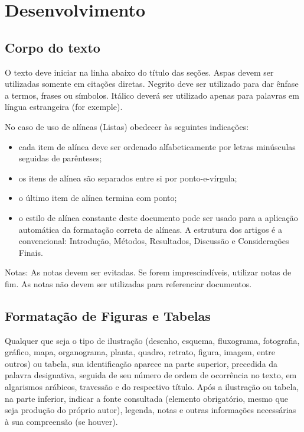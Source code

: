 \documentclass{modelo}
\begin{document}
 
\section{Desenvolvimento}  

\subsection{Corpo do texto} O texto deve iniciar na linha abaixo do título das seções. 
Aspas devem ser utilizadas somente em citações diretas. Negrito deve ser utilizado para dar ênfase a termos, frases ou símbolos. Itálico deverá ser utilizado apenas para palavras em língua estrangeira (for exemple). 

No caso de uso de alíneas (Listas) obedecer às seguintes indicações: 
\begin{itemize}
\item cada item de alínea deve ser ordenado alfabeticamente por letras minúsculas seguidas de parênteses;
\item os itens de alínea são separados entre si por ponto-e-vírgula;
\item o último item de alínea termina com ponto;
\item 	o estilo de alínea constante deste documento pode ser usado para a aplicação automática da formatação correta de alíneas.
A estrutura dos artigos é a convencional: Introdução, Métodos, Resultados, Discussão e Considerações Finais. 
\end{itemize}  

Notas: As notas devem ser evitadas. Se forem imprescindíveis, utilizar notas de fim. As notas não devem ser utilizadas para referenciar documentos. 

 
\subsection{Formatação de Figuras e Tabelas}  
  
Qualquer que seja o tipo de ilustração (desenho, esquema, fluxograma, fotografia, gráfico, mapa, organograma, planta, quadro, retrato, figura, imagem, entre outros) ou tabela, sua identificação aparece na parte superior, precedida da palavra designativa, seguida de seu número de ordem de ocorrência no texto, em algarismos arábicos, travessão e do respectivo título. Após a ilustração ou tabela, na parte inferior, indicar a fonte consultada (elemento obrigatório, mesmo que seja produção do próprio autor), legenda, notas e outras informações necessárias à sua compreensão (se houver). 
 
\end{document}
